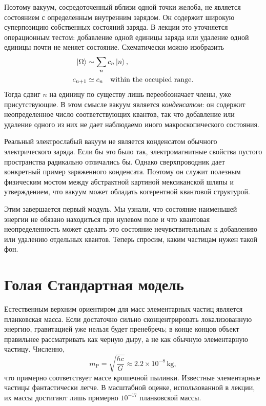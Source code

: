 Поэтому вакуум, сосредоточенный вблизи одной точки желоба, не является состоянием с определенным внутренним зарядом. Он содержит широкую суперпозицию собственных состояний заряда. В лекции это уточняется операционным тестом: добавление одной единицы заряда или удаление одной единицы почти не меняет состояние. Схематически можно изобразить
\begin{align}
\left\lvert\Omega\right\rangle
&\sim
\sum_n c_n\left\lvert n\right\rangle,
\\
c_{n+1}
&\simeq
c_n
\quad\text{within the occupied range}.
\end{align}
Тогда сдвиг $n$ на единицу по существу лишь переобозначает члены, уже присутствующие. В этом смысле вакуум является \emph{конденсатом}: он содержит неопределенное число соответствующих квантов, так что добавление или удаление одного из них не дает наблюдаемо иного макроскопического состояния.

Реальный электрослабый вакуум не является конденсатом обычного электрического заряда. Если бы это было так, электромагнитные свойства пустого пространства радикально отличались бы. Однако сверхпроводник дает конкретный пример заряженного конденсата. Поэтому он служит полезным физическим мостом между абстрактной картиной мексиканской шляпы и утверждением, что вакуум может обладать когерентной квантовой структурой.

Этим завершается первый модуль. Мы узнали, что состояние наименьшей энергии не обязано находиться при нулевом поле и что квантовая неопределенность может сделать это состояние нечувствительным к добавлению или удалению отдельных квантов. Теперь спросим, каким частицам нужен такой фон.

\section{Голая Стандартная модель}

Естественным верхним ориентиром для масс элементарных частиц является планковская масса. Если достаточно сильно сконцентрировать локализованную энергию, гравитацией уже нельзя будет пренебречь; в конце концов объект правильнее рассматривать как черную дыру, а не как обычную элементарную частицу. Численно,
\begin{equation}
m_{\mathrm P}
=
\sqrt{\frac{\hbar c}{G}}
\approx
2.2\times10^{-8}\,\mathrm{kg},
\end{equation}
что примерно соответствует массе крошечной пылинки. Известные элементарные частицы фантастически легче. В масштабной оценке, использованной в лекции, их массы достигают лишь примерно $10^{-17}$ планковской массы.

